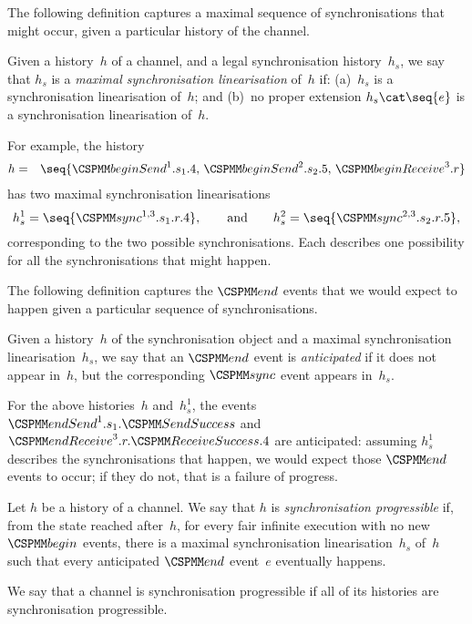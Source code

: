 The following definition captures a maximal sequence of synchronisations that
might occur, given a particular history of the channel.
%
\begin{definition}
Given a history~$h$ of a channel, and a legal synchronisation history~$h_s$,
we say that $h_s$ is a \emph{maximal synchronisation linearisation} of~$h$ if:
(a)~$h_s$ is a synchronisation linearisation of~$h$; and (b)~no proper
extension $h_s \cat \seq{e}$ is a synchronisation linearisation of~$h$.
\end{definition}
%
For example, the history 
\begin{eqnarray*}
h & = &\seq{\beginSend^1.s_1.4,\, \beginSend^2.s_2.5,\, \beginReceive^3.r }
\end{eqnarray*}
has two maximal synchronisation linearisations
\[
h_s^1  =   \seq{\sync^{1,3}.s_1.r.4}, \qquad\mbox{and}\qquad
h_s^2  =  \seq{\sync^{2,3}.s_2.r.5},
\]
corresponding to the two possible synchronisations.  Each describes one
possibility for all the synchronisations that might happen. 


The following definition captures the $\End$ events that we would expect to
happen given a particular sequence of synchronisations.
%
\begin{definition}
Given a history~$h$ of the synchronisation object and a maximal
synchronisation linearisation~$h_s$, we say that an $\End$ event is
\emph{anticipated} if it does not appear in~$h$, but the corresponding $\sync$
event appears in~$h_s$.
\end{definition}
%
For the above histories~$h$ and~$h_s^1$, the events
$\endSend^1.s_1.\SendSuccess$ and $\endReceive^3.r.\ReceiveSuccess.4$  are
anticipated: assuming $h_s^1$ describes the synchronisations that happen, we
would expect those $\End$ events to occur; if they do not, that is a failure
of progress.


\begin{definition}
Let $h$ be a history of a channel.  We say that $h$ is \emph{synchronisation
  progressible} if, from the state reached after~$h$, for every fair infinite
execution with no new $\Begin$ events, there is a maximal synchronisation
  linearisation~$h_s$ of~$h$ such that every anticipated $\End$ event~$e$
  eventually happens.

We say that a channel is synchronisation progressible if all of its histories
are synchronisation progressible.
\end{definition}

